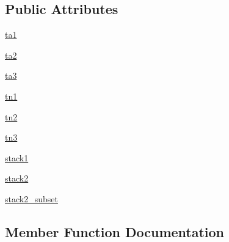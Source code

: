 \subsection*{Public Attributes}
\begin{DoxyCompactItemize}
\item 
\hyperlink{classmatplotlib_1_1tests_1_1test__transforms_1_1TestBasicTransform_a7a5fd018d20ffdcf0670dfa9bf964c9b}{ta1}
\item 
\hyperlink{classmatplotlib_1_1tests_1_1test__transforms_1_1TestBasicTransform_a046303fe8de7a9b6526caaca67bad4e2}{ta2}
\item 
\hyperlink{classmatplotlib_1_1tests_1_1test__transforms_1_1TestBasicTransform_a7e2125ddc0235b145fc213a0223bb666}{ta3}
\item 
\hyperlink{classmatplotlib_1_1tests_1_1test__transforms_1_1TestBasicTransform_af87635d37ade63373c2ee5df5c474c43}{tn1}
\item 
\hyperlink{classmatplotlib_1_1tests_1_1test__transforms_1_1TestBasicTransform_ac30bb5a5cca05af6044474c96c498422}{tn2}
\item 
\hyperlink{classmatplotlib_1_1tests_1_1test__transforms_1_1TestBasicTransform_a4702c76e1f206ee82971678e5ec84a05}{tn3}
\item 
\hyperlink{classmatplotlib_1_1tests_1_1test__transforms_1_1TestBasicTransform_a178c00605eb3c2c6e0ce1dfde7833293}{stack1}
\item 
\hyperlink{classmatplotlib_1_1tests_1_1test__transforms_1_1TestBasicTransform_a6f46906a0fbdf5359a796aa800563f61}{stack2}
\item 
\hyperlink{classmatplotlib_1_1tests_1_1test__transforms_1_1TestBasicTransform_a88925ec9d012461044baa63fefde0a18}{stack2\+\_\+subset}
\end{DoxyCompactItemize}


\subsection{Member Function Documentation}
\mbox{\label{classmatplotlib_1_1tests_1_1test__transforms_1_1TestBasicTransform_a5562a78f27d717cdeb2ecc4c5f97087b}} 
